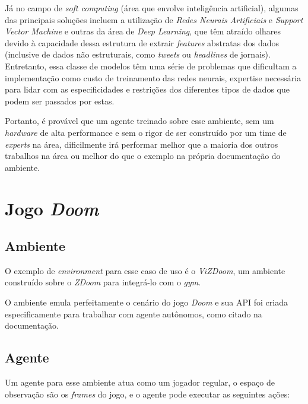 \documentclass[12pt]{article}
\begin{document}
Já no campo de \textit{soft computing} (área que envolve inteligência artificial), algumas das principais soluções incluem a utilização de \textit{Redes Neurais Artificiais}\cite{yakupmelek} e \textit{Support Vector Machine}\cite{shetaalaa, huang} e outras da área de \textit{Deep Learning}\cite{goodfellow}, que têm atraído olhares devido à capacidade dessa estrutura de extrair \textit{features} abstratas dos dados (inclusive de dados não estruturais, como \textit{tweets} ou \textit{headlines} de jornais\cite{bollen, headlines}). Entretanto, essa classe de modelos têm uma série de problemas que dificultam a implementação como custo de treinamento das redes neurais, expertise necessária para lidar com as especificidades e restrições dos diferentes tipos de dados que podem ser passados por estas.\par

Portanto, é provável que um agente treinado sobre esse ambiente, sem um \textit{hardware} de alta performance e sem o rigor de ser construído por um time de \textit{experts} na área, dificilmente irá performar melhor que a maioria dos outros trabalhos na área ou melhor do que o exemplo na própria documentação do ambiente.

\pagebreak

\section{Jogo \textit{Doom}}

\subsection{Ambiente}

O exemplo de \textit{environment} para esse caso de uso é o \textit{ViZDoom}\cite{vizdoom}, um ambiente construído sobre o \textit{ZDoom}\cite{zdoom} para integrá-lo com o \textit{gym}.

O ambiente emula perfeitamente o cenário do jogo \textit{Doom} e sua API foi criada especificamente para trabalhar com agente autônomos, como citado na documentação.

\subsection{Agente}

Um agente para esse ambiente atua como um jogador regular, o espaço de observação são os \textit{frames} do jogo, e o agente pode executar as seguintes ações:
\end{document}

